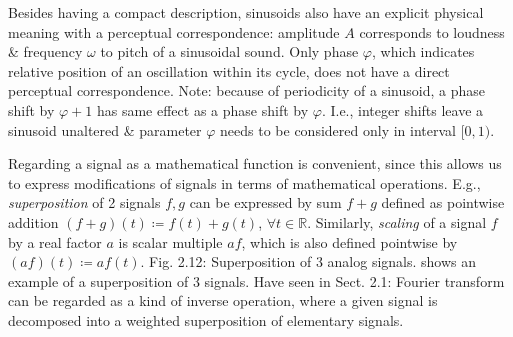 \documentclass{article}
\begin{document}
\begin{itemize}
\begin{itemize}
\begin{itemize}
			Besides having a compact description, sinusoids also have an explicit physical meaning with a perceptual correspondence: amplitude $A$ corresponds to loudness \& frequency $\omega$ to pitch of a sinusoidal sound. Only phase $\varphi$, which indicates relative position of an oscillation within its cycle, does not have a direct perceptual correspondence. Note: because of periodicity of a sinusoid, a phase shift by $\varphi + 1$ has same effect as a phase shift by $\varphi$. I.e., integer shifts leave a sinusoid unaltered \& parameter $\varphi$ needs to be considered only in interval $[0,1)$.
			
			Regarding a signal as a mathematical function is convenient, since this allows us to express modifications of signals in terms of mathematical operations. E.g., {\it superposition} of 2 signals $f,g$ can be expressed by sum $f + g$ defined as pointwise addition $(f + g)(t)\coloneqq f(t) + g(t)$, $\forall t\in\mathbb{R}$. Similarly, {\it scaling} of a signal $f$ by a real factor $a$ is scalar multiple $af$, which is also defined pointwise by $(af)(t)\coloneqq af(t)$. {\sf Fig. 2.12: Superposition of 3 analog signals.} shows an example of a superposition of 3 signals. Have seen in Sect. 2.1: Fourier transform can be regarded as a kind of inverse operation, where a given signal is decomposed into a weighted superposition of elementary signals.
			

\end{itemize}
\end{itemize}
\end{itemize}
\end{document}
